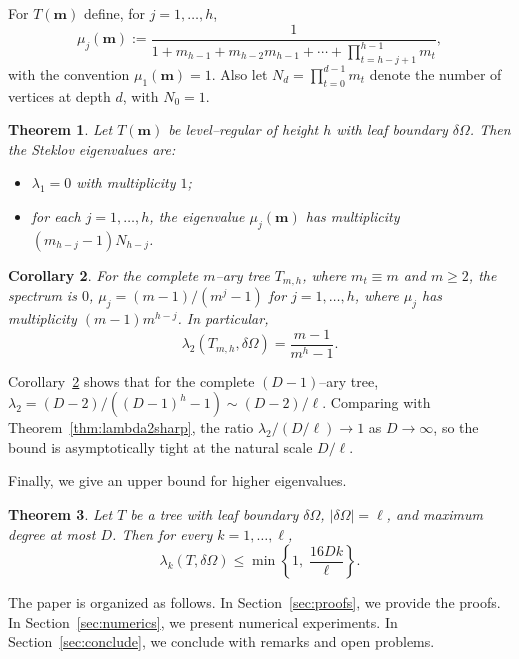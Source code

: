 \documentclass[11pt]{article}
\newtheorem{theorem}{Theorem}[section]
\newtheorem{corollary}[theorem]{Corollary}
\theoremstyle{definition}
\theoremstyle{remark}
\newcommand{\dO}{\delta\Omega}
\begin{document}
For $T(\mathbf{m})$ define, for $j=1,\dots,h$,
\begin{equation}\label{eq:muj}
\mu_j(\mathbf{m}):=\frac{1}{1+m_{h-1}+m_{h-2}m_{h-1}+\cdots+\prod_{t=h-j+1}^{h-1}m_t},
\end{equation}
with the convention $\mu_1(\mathbf{m})=1$.
Also let $N_d=\prod_{t=0}^{d-1}m_t$ denote the number of vertices at depth $d$, with $N_0=1$.

\begin{theorem}\label{thm:levelspec}
Let $T(\mathbf{m})$ be level--regular of height $h$ with leaf boundary $\dO$.
Then the Steklov eigenvalues are:
\begin{itemize}[leftmargin=2em]
\item $\lambda_1=0$ with multiplicity $1$;
\item for each $j=1,\dots,h$, the eigenvalue $\mu_j(\mathbf{m})$ has multiplicity $(m_{h-j}-1)N_{h-j}$.
\end{itemize}
\end{theorem}

\begin{corollary}\label{cor:mary}
For the complete $m$--ary tree $T_{m,h}$, where $m_t\equiv m$ and $m\ge 2$, the spectrum is $0$, $\mu_j=(m-1)/(m^j-1)$ for $j=1,\dots,h$, where $\mu_j$ has multiplicity $(m-1)m^{h-j}$.
In particular,
\begin{equation}\label{eq:mary}
\lambda_2(T_{m,h},\dO)=\frac{m-1}{m^h-1}.
\end{equation}
\end{corollary}

Corollary~\ref{cor:mary} shows that for the complete $(D-1)$--ary tree, $\lambda_2=(D-2)/((D-1)^h-1)\sim (D-2)/\ell$.
Comparing with Theorem~\ref{thm:lambda2sharp}, the ratio $\lambda_2/(D/\ell)\to 1$ as $D\to\infty$, so the bound is asymptotically tight at the natural scale $D/\ell$.

Finally, we give an upper bound for higher eigenvalues.

\begin{theorem}\label{thm:lambdak}
Let $T$ be a tree with leaf boundary $\dO$, $|\dO|=\ell$, and maximum degree at most $D$.
Then for every $k=1,\dots,\ell$,
\begin{equation}\label{eq:lambdak}
\lambda_k(T,\dO)\le \min\!\left\{1,\;\frac{16Dk}{\ell}\right\}.
\end{equation}
\end{theorem}

The paper is organized as follows.
In Section~\ref{sec:proofs}, we provide the proofs.
In Section~\ref{sec:numerics}, we present numerical experiments.
In Section~\ref{sec:conclude}, we conclude with remarks and open problems.
\end{document}
